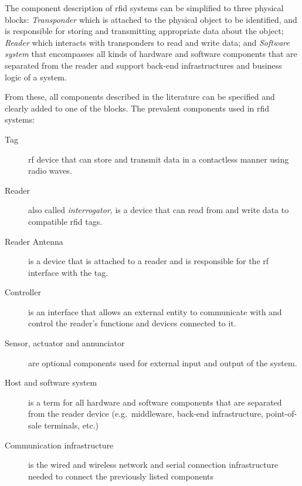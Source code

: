 The component description of \ac{rfid} systems can be simplified to three physical blocks: \emph{Transponder} which is attached to the physical object to be identified, and is responsible for storing and transmitting appropriate data about the object; \emph{Reader} which interacts with transponders to read and write data; and \emph{Software system} that encompasses all kinds of hardware and software components that are separated from the reader and support back-end infrastructures and business logic of a system.

From these, all components described in the literature can be specified and clearly added to one of the blocks.
The prevalent components used in \ac{rfid} systems:

\begin{description}
    \item[Tag] \ac{rf} device that can store and transmit data in a contactless manner using radio waves.
    \item[Reader] also called \emph{interrogator}, is a device that can read from and write data to compatible \ac{rfid} tags.
    \item[Reader Antenna] is a device that is attached to a reader and is responsible for the \ac{rf} interface with the tag.
    \item[Controller] is an interface that allows an external entity to communicate with and control the reader's functions and devices connected to it.
    \item[Sensor, actuator and annunciator] are optional components used for external input and output of the system.
    \item[Host and software system] is a term for all hardware and software components that are separated from the reader device (e.g.\ middleware, back-end infrastructure, point-of-sale terminals, etc.)
    \item[Communication infrastructure] is the wired and wireless network and serial connection infrastructure needed to connect the previously listed components
\end{description}


